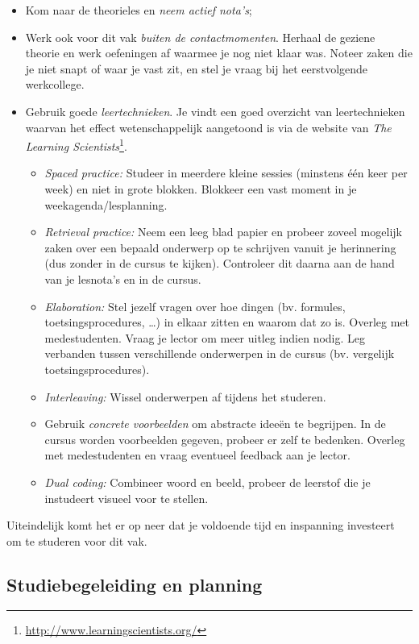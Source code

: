 \begin{itemize}
  \item Kom naar de theorieles en \emph{neem actief nota's};
  \item Werk ook voor dit vak \emph{buiten de contactmomenten}. Herhaal de geziene theorie en werk oefeningen af waarmee je nog niet klaar was. Noteer zaken die je niet snapt of waar je vast zit, en stel je vraag bij het eerstvolgende werkcollege.
  \item Gebruik goede \emph{leertechnieken}. Je vindt een goed overzicht van leertechnieken waarvan het effect wetenschappelijk aangetoond is via de website van \emph{The Learning Scientists}\footnote{\url{http://www.learningscientists.org/}}.
  \begin{itemize}
    \item \emph{Spaced practice:} Studeer in meerdere kleine sessies (minstens één keer per week) en niet in grote blokken. Blokkeer een vast moment in je weekagenda/lesplanning.
    \item \emph{Retrieval practice:} Neem een leeg blad papier en probeer zoveel mogelijk zaken over een bepaald onderwerp op te schrijven vanuit je herinnering (dus zonder in de cursus te kijken). Controleer dit daarna aan de hand van je lesnota's en in de cursus.
    \item \emph{Elaboration:} Stel jezelf vragen over hoe dingen (bv. formules, toetsingsprocedures, \ldots) in elkaar zitten en waarom dat zo is. Overleg met medestudenten. Vraag je lector om meer uitleg indien nodig. Leg verbanden tussen verschillende onderwerpen in de cursus (bv. vergelijk toetsingsprocedures).
    \item \emph{Interleaving:} Wissel onderwerpen af tijdens het studeren.
    \item Gebruik \emph{concrete voorbeelden} om abstracte ideeën te begrijpen. In de cursus worden voorbeelden gegeven, probeer er zelf te bedenken. Overleg met medestudenten en vraag eventueel feedback aan je lector.
    \item \emph{Dual coding:} Combineer woord en beeld, probeer de leerstof die je instudeert visueel voor te stellen.
  \end{itemize}
\end{itemize}

Uiteindelijk komt het er op neer dat je voldoende tijd en inspanning investeert om te studeren voor dit vak.

\subsection{Studiebegeleiding en planning}

